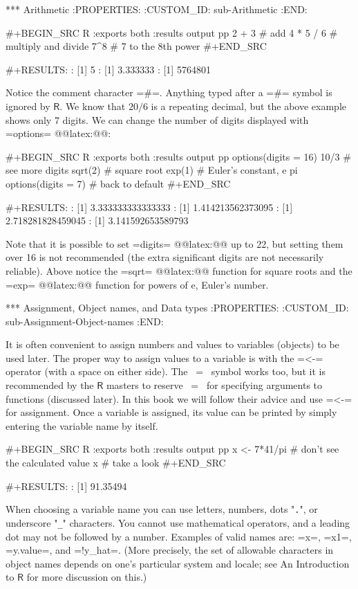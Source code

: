*** Arithmetic
:PROPERTIES:
:CUSTOM_ID: sub-Arithmetic
:END:

#+BEGIN_SRC R :exports both :results output pp  
2 + 3       # add
4 * 5 / 6   # multiply and divide
7^8         # 7 to the 8th power
#+END_SRC

#+RESULTS:
: [1] 5
: [1] 3.333333
: [1] 5764801

Notice the comment character =#=. Anything typed
after a =#= symbol is ignored by \(\mathsf{R}\). We know that \(20/6\)
is a repeating decimal, but the above example shows only 7 digits. We
can change the number of digits displayed with
=options= @@latex:@@:

#+BEGIN_SRC R :exports both :results output pp 
options(digits = 16)
10/3                 # see more digits
sqrt(2)              # square root
exp(1)               # Euler's constant, e
pi       
options(digits = 7)  # back to default
#+END_SRC

#+RESULTS:
: [1] 3.333333333333333
: [1] 1.414213562373095
: [1] 2.718281828459045
: [1] 3.141592653589793

Note that it is possible to set =digits=
@@latex:@@ up to 22, but setting them
over 16 is not recommended (the extra significant digits are not
necessarily reliable). Above notice the =sqrt=
@@latex:@@ function for square roots and the
=exp= @@latex:@@ function for powers of
\(\mathrm{e}\), Euler's number.

*** Assignment, Object names, and Data types
:PROPERTIES:
:CUSTOM_ID: sub-Assignment-Object-names
:END:

It is often convenient to assign numbers and values to variables
(objects) to be used later. The proper way to assign values to a
variable is with the =<-= operator (with a space on either side). The
~=~ symbol works too, but it is recommended by the \(\mathsf{R}\)
masters to reserve ~=~ for specifying arguments to functions
(discussed later). In this book we will follow their advice and use
=<-= for assignment. Once a variable is assigned, its value can be
printed by simply entering the variable name by itself.

#+BEGIN_SRC R :exports both :results output pp 
x <- 7*41/pi   # don't see the calculated value
x              # take a look
#+END_SRC

#+RESULTS:
: [1] 91.35494

When choosing a variable name you can use letters, numbers, dots
"\texttt{.}", or underscore "\texttt{\_}" characters. You cannot
use mathematical operators, and a leading dot may not be followed by a
number. Examples of valid names are: =x=, =x1=, =y.value=, and
=!y_hat=. (More precisely, the set of allowable characters in object
names depends on one's particular system and locale; see An
Introduction to \(\mathsf{R}\) for more discussion on this.)

